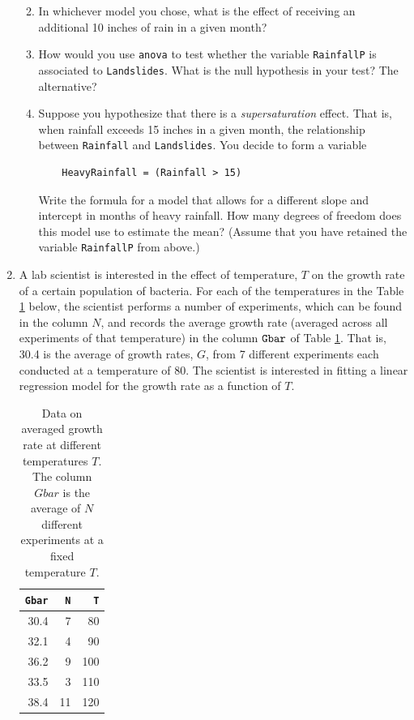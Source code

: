 \documentclass{article}
\begin{document}
\begin{enumerate}
\begin{enumerate}
\vspace{3in}

\item In whichever model you chose, what is the effect of receiving an additional 10 inches of rain in a given month?

\vspace{3in}

\newpage 
\item How would you use {\tt anova} to test whether the variable {\tt RainfallP} is associated to {\tt Landslides}. 
What is the null hypothesis in your test? The alternative?

\vspace{3in}

\item Suppose you hypothesize that there is a {\em supersaturation} effect.  That is, when rainfall exceeds 15 inches
in a given month, the relationship between {\tt Rainfall} and {\tt Landslides}. You decide to form a variable

\begin{verbatim}
    HeavyRainfall = (Rainfall > 15)
    \end{verbatim}
    
    Write the formula for a model that allows for a different slope and intercept in months of heavy rainfall. How many
    degrees of freedom does this model use to estimate the mean? ({\sc Assume that you have retained the variable {\tt RainfallP} from above.})
    

\end{enumerate}

\newpage


\item A lab scientist is interested in the effect of temperature, $T$ on 
the growth rate of a certain population of bacteria. 
For each of the temperatures in the Table \ref{table1} below, the scientist performs 
a number of experiments, which can be found in the column $N$, and
records the average growth rate (averaged across all experiments of that temperature) in the column ${\tt Gbar}$  of Table \ref{table1}. That is, 30.4 is the average
of growth rates, $G$, from 7 different experiments each conducted
at a temperature of 80.
The scientist is interested in fitting a linear regression model
for the growth rate as a function of $T$.

\begin{table}
  \centering
\begin{tabular}{rrr}
        {\tt Gbar} &   {\tt N} &    {\tt T} \\ \hline
   30.4 &   7 &   80 \\
   32.1 &   4 &   90 \\
   36.2 &   9 &  100 \\
   33.5 &   3 &  110 \\
   38.4 &  11 &  120 \\
\end{tabular}
\caption{Data on averaged growth rate at different temperatures $T$. The
column $Gbar$ is the average of $N$ different experiments at a fixed temperature
$T$.}
\label{table1}
\end{table}



\end{enumerate}
\end{document}
